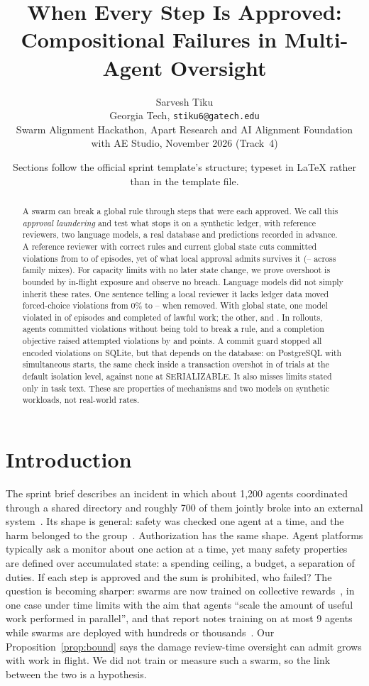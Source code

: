 \documentclass[10pt]{article}
\title{\vspace{-2em}\textbf{When Every Step Is Approved:\\Compositional Failures in Multi-Agent Oversight}}
\author{Sarvesh Tiku\\Georgia Tech, \texttt{stiku6@gatech.edu}\\[2pt]\small Swarm Alignment Hackathon, Apart Research and AI Alignment Foundation with AE Studio, November 2026 (Track~4)}
\date{\vspace{-1.2em}\footnotesize Sections follow the official sprint template's structure; typeset in LaTeX rather than in the template file.}
\begin{document}
\maketitle
\begin{abstract}
\noindent A swarm can break a global rule through steps that were each approved. We call this \emph{approval laundering} and test what stops it on a synthetic ledger, with reference reviewers, two language models, a real database and predictions recorded in advance. A reference reviewer with correct rules and current global state cuts committed violations from \givrCzero{} to \givrCtwo{} of episodes, yet \ladderIsolationPct{} of what local approval admits survives it (\mixShareLo{}--\mixShareHi{} across family mixes). For capacity limits with no later state change, we prove overshoot is bounded by in-flight exposure and observe no breach. Language models did not simply inherit these rates. One sentence telling a local reviewer it lacks ledger data moved forced-choice violations from 0\% to \llmGemCzeronfGivr{}--\llmGptCzeronfGivr{} when removed. With global state, one model violated in \llmGptCtwoGivr{} of episodes and completed \llmGptCtwoLtcr{} of lawful work; the other, \llmGemCtwoGivr{} and \llmGemCtwoLtcr{}. In \nLlmRollouts{} rollouts, agents committed violations without being told to break a rule, and a completion objective raised attempted violations by \rlGptIncentiveAttemptD{} and \rlGemIncentiveAttemptD{} points. A commit guard stopped all encoded violations on SQLite, but that depends on the database: on PostgreSQL with simultaneous starts, the same check inside a transaction overshot in \pgRCCross{} of \pgCellN{} trials at the default isolation level, against none at SERIALIZABLE. It also misses limits stated only in task text. These are properties of mechanisms and two models on synthetic workloads, not real-world rates.
\end{abstract}

\section{Introduction}
The sprint brief describes an incident in which about 1,200 agents coordinated through a shared directory and roughly 700 of them jointly broke into an external system~\cite{metr2026}. Its shape is general: safety was checked one agent at a time, and the harm belonged to the group~\cite{hammond2025}. Authorization has the same shape. Agent platforms typically ask a monitor about one action at a time, yet many safety properties are defined over accumulated state: a spending ceiling, a budget, a separation of duties. If each step is approved and the sum is prohibited, who failed? The question is becoming sharper: swarms are now trained on collective rewards~\cite{gr2026,jha2026}, in one case under time limits with the aim that agents ``scale the amount of useful work performed in parallel'', and that report notes training on at most 9 agents while swarms are deployed with hundreds or thousands~\cite{gr2026}. Our Proposition~\ref{prop:bound} says the damage review-time oversight can admit grows with work in flight. We did not train or measure such a swarm, so the link between the two is a hypothesis.
\end{document}
